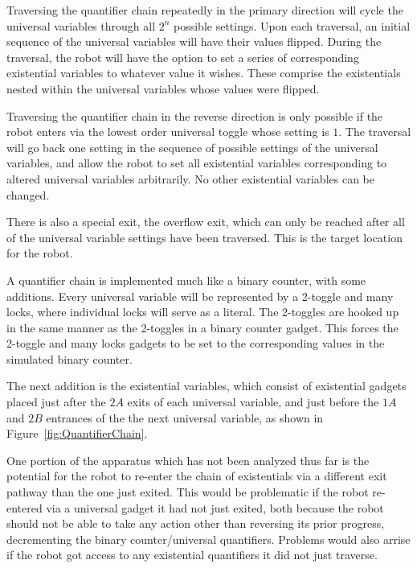 Traversing the quantifier chain
repeatedly in the primary direction will cycle the universal variables through all $2^n$ possible settings.
Upon each traversal, an initial sequence of the universal variables will have their values flipped.
During the traversal, the robot will have the option to set a series of corresponding existential variables to whatever value it wishes. These comprise the existentials nested within the universal variables whose values were flipped.

Traversing  the quantifier chain in the reverse direction is only possible if the robot enters
via the lowest order universal toggle whose setting is $1$. The traversal will go back one setting in the
sequence of possible settings of the universal variables, and allow the robot to set all existential variables
corresponding to altered universal variables arbitrarily. No other existential variables can be changed.

There is also a special exit, the overflow exit, which can only be
reached after all of the universal variable settings have been traversed. This is the target location for the robot.

A quantifier chain is implemented much like a binary counter, with some additions. Every universal variable will be represented by a 2-toggle and many locks, where individual locks will serve as a literal. The 2-toggles are hooked up in the same manner as the 2-toggles in a binary counter gadget. This forces the 2-toggle and many locks gadgets to be set to the corresponding values in the simulated binary counter.

The next addition is the existential variables, which consist of existential gadgets placed just after the $2A$
exits of each universal variable,
and just before the $1A$ and $2B$ entrances of the the next universal variable, as shown
in Figure~\ref{fig:QuantifierChain}.

One portion of the apparatus which has not been analyzed thus far is the potential for the robot to re-enter the chain of existentials
via a different exit pathway than the one just exited. This would be problematic if the robot re-entered via a universal gadget it had not just exited,
both because the robot should not be able to take any action other than reversing its prior progress, 
decrementing the binary counter/universal quantifiers. Problems would also arrise if the robot got access to any existential quantifiers 
it did not just traverse.


